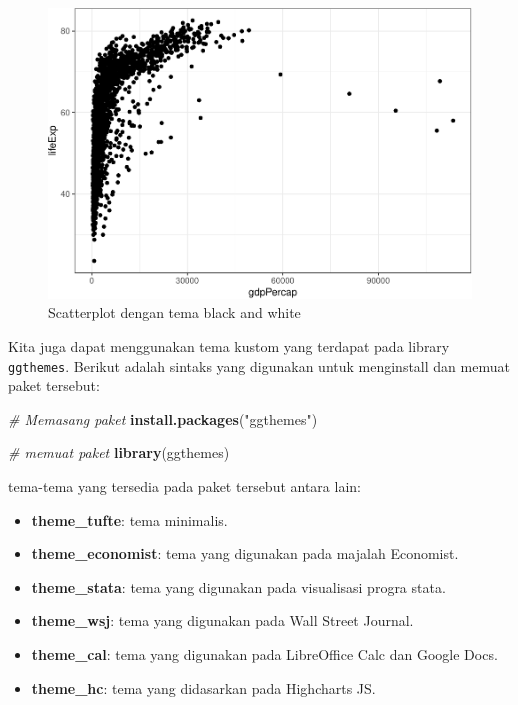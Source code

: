\documentclass[]{book}
\newenvironment{Shaded}{\begin{snugshade}}{\end{snugshade}}
\newcommand{\KeywordTok}[1]{\textcolor[rgb]{0.13,0.29,0.53}{\textbf{#1}}}
\newcommand{\StringTok}[1]{\textcolor[rgb]{0.31,0.60,0.02}{#1}}
\newcommand{\CommentTok}[1]{\textcolor[rgb]{0.56,0.35,0.01}{\textit{#1}}}
\newcommand{\NormalTok}[1]{#1}
\providecommand{\tightlist}{%
  \setlength{\itemsep}{0pt}\setlength{\parskip}{0pt}}
\begin{document}
\begin{figure}

{\centering \includegraphics[width=0.7\linewidth]{EnvStat_files/figure-latex/ggtema-1} 

}

\caption{Scatterplot dengan tema black and white}\label{fig:ggtema}
\end{figure}

Kita juga dapat menggunakan tema kustom yang terdapat pada library
\texttt{ggthemes}. Berikut adalah sintaks yang digunakan untuk
menginstall dan memuat paket tersebut:

\begin{Shaded}
\begin{Highlighting}[]
\CommentTok{# Memasang paket}
\KeywordTok{install.packages}\NormalTok{(}\StringTok{"ggthemes"}\NormalTok{)}
\end{Highlighting}
\end{Shaded}

\begin{Shaded}
\begin{Highlighting}[]
\CommentTok{# memuat paket}
\KeywordTok{library}\NormalTok{(ggthemes)}
\end{Highlighting}
\end{Shaded}

tema-tema yang tersedia pada paket tersebut antara lain:

\begin{itemize}
\tightlist
\item
  \textbf{theme\_tufte}: tema minimalis.
\item
  \textbf{theme\_economist}: tema yang digunakan pada majalah Economist.
\item
  \textbf{theme\_stata}: tema yang digunakan pada visualisasi progra
  stata.
\item
  \textbf{theme\_wsj}: tema yang digunakan pada Wall Street Journal.
\item
  \textbf{theme\_cal}: tema yang digunakan pada LibreOffice Calc dan
  Google Docs.
\item
  \textbf{theme\_hc}: tema yang didasarkan pada Highcharts JS.
\end{itemize}
\end{document}
